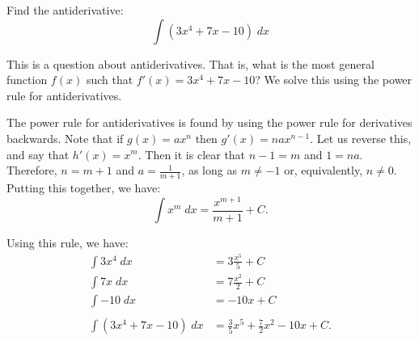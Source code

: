 \documentclass{ximera}
\author{Emma Smith Zbarsky}
\begin{document}
\begin{exercise}

Find the antiderivative: \[\int (3x^4+7x-10)\; dx\]


\begin{hint}
This is a question about antiderivatives. That is, what is the most
general function $f(x)$ such that $f'(x) = 3x^4+7x-10$? We solve this
using the power rule for antiderivatives.
\end{hint}


\begin{hint}
The power rule for antiderivatives is found by using the power rule for
derivatives backwards. Note that if $g(x) = ax^n$ then
$g'(x) = nax^{n-1}$. Let us reverse this, and say that $h'(x) = x^m$.
Then it is clear that $n-1 = m$ and $1=na$. Therefore, $n= m+1$ and
$a = \frac{1}{m+1}$, as long as $m\neq -1$ or, equivalently, $n\neq 0$.
Putting this together, we have:
\[\int x^m\; dx = \frac{x^{m+1}}{m+1} + C.\]

Using this rule, we have: \begin{align*}
\int 3x^4 \; dx &= 3\frac{x^5}{5} + C \\
\int 7x \; dx &= 7 \frac{x^2}{2} + C \\
\int -10 \; dx &= -10x + C \\
& \\
\int (3x^4+7x-10)\; dx &= \frac{3}{5}x^5 + \frac{7}{2}x^2 -10x + C.
\end{align*}
\end{hint}


\begin{multipleChoice}
\end{multipleChoice}

\end{exercise}
\end{document}
